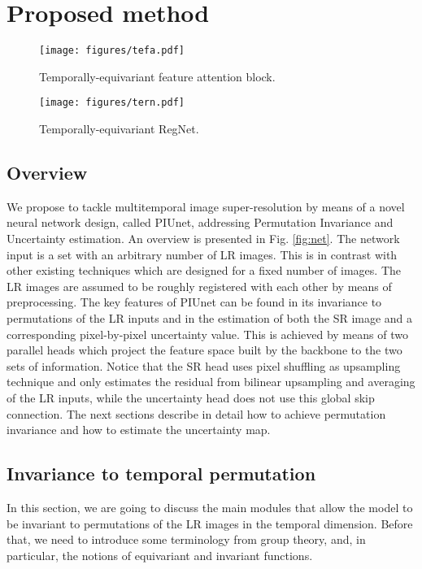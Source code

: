 \documentclass[journal]{IEEEtran}
\begin{document}
\section{Proposed method}
\label{sec:method}





\begin{figure}[ht!]
\centering
\texttt{[image: figures/tefa.pdf]}
\caption{Temporally-equivariant feature attention block.}
\label{fig:tefa}
\end{figure}


\begin{figure}[ht!]
\centering
\texttt{[image: figures/tern.pdf]}
\caption{Temporally-equivariant RegNet.}
\label{fig:tern}
\end{figure}

\subsection{Overview}

We propose to tackle multitemporal image super-resolution by means of a novel neural network design, called PIUnet, addressing Permutation Invariance and Uncertainty estimation. An overview is presented in Fig. \ref{fig:net}. The network input is a set with an arbitrary number of LR images. This is in contrast with other existing techniques which are designed for a fixed number of images. The LR images are assumed to be roughly registered with each other by means of preprocessing. The key features of PIUnet can be found in its invariance to permutations of the LR inputs and in the estimation of both the SR image and a corresponding pixel-by-pixel uncertainty value. This is achieved by means of two parallel heads which project the feature space built by the backbone to the two sets of information. Notice that the SR head uses pixel shuffling \cite{shi2016real} as upsampling technique and only estimates the residual from bilinear upsampling and averaging of the LR inputs, while the uncertainty head does not use this global skip connection. The next sections describe in detail how to achieve permutation invariance and how to estimate the uncertainty map.


\subsection{Invariance to temporal permutation}

In this section, we are going to discuss the main modules that allow the model to be invariant to permutations of the LR images in the temporal dimension. Before that, we need to introduce some terminology from group theory, and, in particular, the notions of equivariant and invariant functions.
\end{document}
